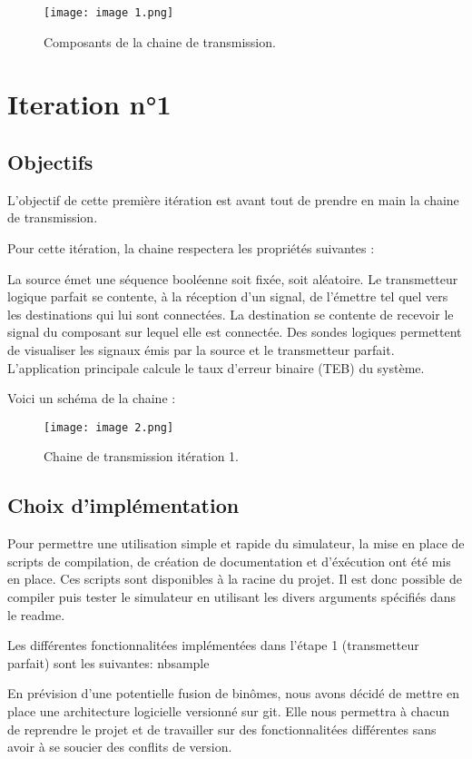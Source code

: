 \begin{figure}[H]
    \centering
    \texttt{[image: image 1.png]}
    \caption{\label{fig:image1}Composants de la chaine de transmission.}
\end{figure}
\newpage
\section{Iteration n°1}
\subsection{Objectifs}

L'objectif de cette première itération est avant tout de prendre en main la chaine de transmission.

Pour cette itération, la chaine respectera les propriétés suivantes :

La source émet une séquence booléenne soit fixée, soit aléatoire.
Le transmetteur logique parfait se contente, à la réception d'un signal, de l'émettre tel quel vers les destinations qui lui sont connectées.
La destination se contente de recevoir le signal du composant sur lequel elle est connectée.
Des sondes logiques permettent de visualiser les signaux émis par la source et le transmetteur parfait.
L'application principale calcule le taux d'erreur binaire (TEB) du système.

Voici un schéma de la chaine :

\begin{figure}[H]
    \centering
    \texttt{[image: image 2.png]}
    \caption{\label{fig:image2}Chaine de transmission itération 1.}
\end{figure}

\subsection{Choix d'implémentation}

Pour permettre une utilisation simple et rapide du simulateur, la mise en place de scripts de compilation, de création de documentation et d'éxécution
ont été mis en place. Ces scripts sont disponibles à la racine du projet.
Il est donc possible de compiler puis tester le simulateur en utilisant les divers arguments spécifiés dans le readme.

Les différentes fonctionnalitées implémentées dans l'étape 1 (transmetteur parfait) sont les suivantes:
nbsample

En prévision d'une potentielle fusion de binômes, nous avons décidé de mettre en place une architecture logicielle versionné sur git.
Elle nous permettra à chacun de reprendre le projet et de travailler sur des fonctionnalitées différentes sans avoir à se soucier des conflits de version.


